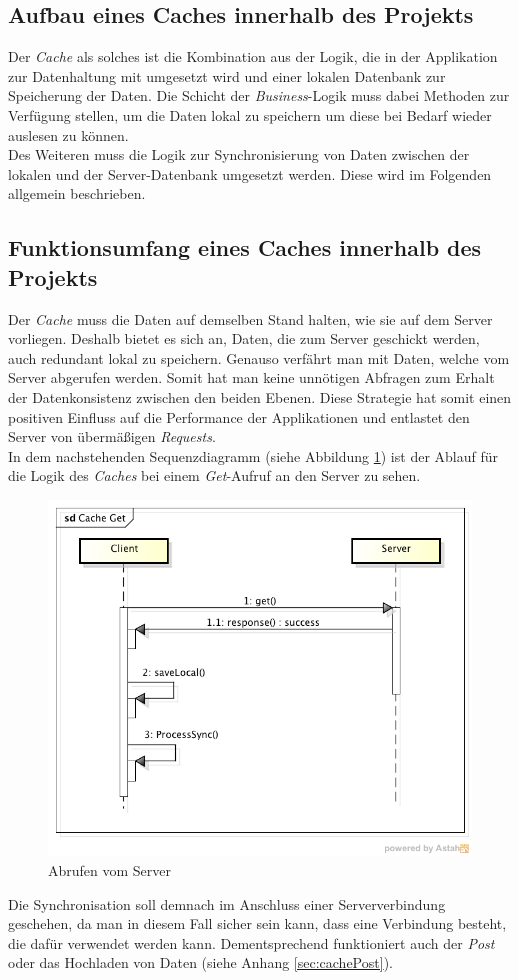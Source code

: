 \subsection{Aufbau eines Caches innerhalb des Projekts}
\label{ssec:cache-aufbau}
Der \textit{Cache} als solches ist die Kombination aus der Logik, die in der Applikation zur Datenhaltung mit umgesetzt wird und einer lokalen Datenbank zur Speicherung der Daten. Die Schicht der \textit{Business}-Logik muss dabei Methoden zur Verfügung stellen, um die Daten lokal zu speichern um diese bei Bedarf wieder auslesen zu können.\\
Des Weiteren muss die Logik zur Synchronisierung von Daten zwischen der lokalen und der Server-Datenbank umgesetzt werden. Diese wird im Folgenden allgemein beschrieben.
\subsection{Funktionsumfang eines Caches innerhalb des Projekts}
\label{ssec:cache-unsere-funktionsweise}
Der \textit{Cache} muss die Daten auf demselben Stand halten, wie sie auf dem Server vorliegen. Deshalb bietet es sich an, Daten, die zum Server geschickt werden, auch redundant lokal zu speichern. Genauso verfährt man mit Daten, welche vom Server abgerufen werden. Somit hat man keine unnötigen Abfragen zum Erhalt der Datenkonsistenz zwischen den beiden Ebenen. Diese Strategie hat somit einen positiven Einfluss auf die Performance der Applikationen und entlastet den Server von übermäßigen \textit{Requests}. \\
In dem nachstehenden Sequenzdiagramm (siehe Abbildung \ref{pic:cacheGet}) ist der Ablauf für die Logik des \textit{Caches} bei einem \textit{Get}-Aufruf an den Server zu sehen.
\begin{figure}[!h]
\centering
\includegraphics[width=0.8\linewidth]{content/images/Cache-Get}
\caption{Abrufen vom Server}
\label{pic:cacheGet}
\end{figure}
Die Synchronisation soll demnach im Anschluss einer Serververbindung geschehen, da man in diesem Fall sicher sein kann, dass eine Verbindung besteht, die dafür verwendet werden kann. Dementsprechend funktioniert auch der \textit{Post} oder das Hochladen von Daten (siehe Anhang \ref{sec:cachePost}).